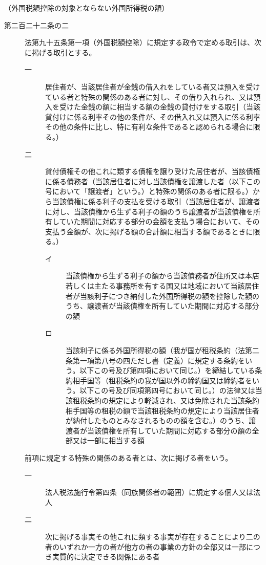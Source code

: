 \documentclass[twocolumn,a4j,10pt]{ltjtarticle}
\begin{document}
\noindent\hspace{10pt}（外国税額控除の対象とならない外国所得税の額）
\begin{description}
\item[第二百二十二条の二]法第九十五条第一項（外国税額控除）に規定する政令で定める取引は、次に掲げる取引とする。
\begin{description}
\item[一]居住者が、当該居住者が金銭の借入れをしている者又は預入を受けている者と特殊の関係のある者に対し、その借り入れられ、又は預入を受けた金銭の額に相当する額の金銭の貸付けをする取引（当該貸付けに係る利率その他の条件が、その借入れ又は預入に係る利率その他の条件に比し、特に有利な条件であると認められる場合に限る。）
\item[二]貸付債権その他これに類する債権を譲り受けた居住者が、当該債権に係る債務者（当該居住者に対し当該債権を譲渡した者（以下この号において「譲渡者」という。）と特殊の関係のある者に限る。）から当該債権に係る利子の支払を受ける取引（当該居住者が、譲渡者に対し、当該債権から生ずる利子の額のうち譲渡者が当該債権を所有していた期間に対応する部分の金額を支払う場合において、その支払う金額が、次に掲げる額の合計額に相当する額であるときに限る。）
\begin{description}
\item[イ]当該債権から生ずる利子の額から当該債務者が住所又は本店若しくは主たる事務所を有する国又は地域において当該居住者が当該利子につき納付した外国所得税の額を控除した額のうち、譲渡者が当該債権を所有していた期間に対応する部分の額
\item[ロ]当該利子に係る外国所得税の額（我が国が租税条約（法第二条第一項第八号の四ただし書（定義）に規定する条約をいう。以下この号及び第四項において同じ。）を締結している条約相手国等（租税条約の我が国以外の締約国又は締約者をいう。以下この号及び同項第四号において同じ。）の法律又は当該租税条約の規定により軽減され、又は免除された当該条約相手国等の租税の額で当該租税条約の規定により当該居住者が納付したものとみなされるものの額を含む。）のうち、譲渡者が当該債権を所有していた期間に対応する部分の額の全部又は一部に相当する額
\end{description}
\end{description}
\item[]前項に規定する特殊の関係のある者とは、次に掲げる者をいう。
\begin{description}
\item[一]法人税法施行令第四条（同族関係者の範囲）に規定する個人又は法人
\item[二]次に掲げる事実その他これに類する事実が存在することにより二の者のいずれか一方の者が他方の者の事業の方針の全部又は一部につき実質的に決定できる関係にある者

\end{description}
\end{description}
\end{document}
